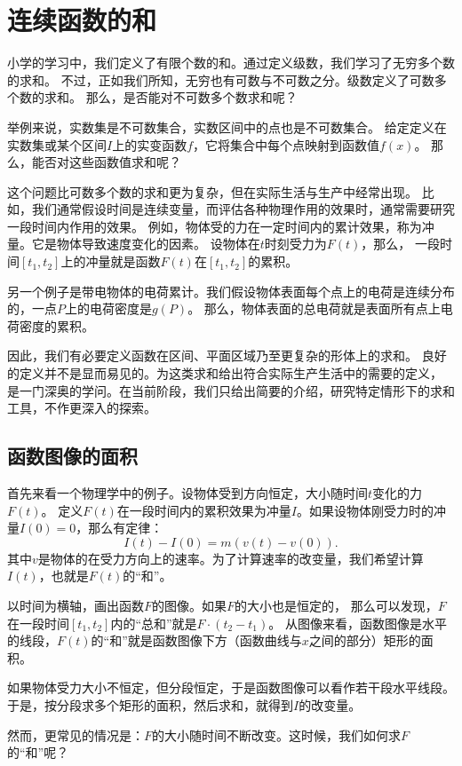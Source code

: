 \documentclass[12pt,UTF8]{ctexbook}
\begin{document}
\chapter{连续函数的和}
小学的学习中，我们定义了有限个数的和。通过定义级数，我们学习了无穷多个数的求和。
不过，正如我们所知，无穷也有可数与不可数之分。级数定义了可数多个数的求和。
那么，是否能对不可数多个数求和呢？

举例来说，实数集是不可数集合，实数区间中的点也是不可数集合。
给定定义在实数集或某个区间$I$上的实变函数$f$，它将集合中每个点映射到函数值$f(x)$。
那么，能否对这些函数值求和呢？

这个问题比可数多个数的求和更为复杂，但在实际生活与生产中经常出现。
比如，我们通常假设时间是连续变量，而评估各种物理作用的效果时，通常需要研究一段时间内作用的效果。
例如，物体受的力在一定时间内的累计效果，称为冲量。它是物体导致速度变化的因素。
设物体在$t$时刻受力为$F(t)$，那么，
一段时间$[t_1, t_2]$上的冲量就是函数$F(t)$在$[t_1, t_2]$的累积。

另一个例子是带电物体的电荷累计。我们假设物体表面每个点上的电荷是连续分布的，一点$P$上的电荷密度是$g(P)$。
那么，物体表面的总电荷就是表面所有点上电荷密度的累积。

因此，我们有必要定义函数在区间、平面区域乃至更复杂的形体上的求和。
良好的定义并不是显而易见的。为这类求和给出符合实际生产生活中的需要的定义，
是一门深奥的学问。在当前阶段，我们只给出简要的介绍，研究特定情形下的求和工具，不作更深入的探索。

\section{函数图像的面积}

首先来看一个物理学中的例子。设物体受到方向恒定，大小随时间$t$变化的力$F(t)$。
定义$F(t)$在一段时间内的累积效果为冲量$I$。如果设物体刚受力时的冲量$I(0) = 0$，那么有定律：
$$ I(t) - I(0) = m(v(t) - v(0)).$$
其中$v$是物体的在受力方向上的速率。为了计算速率的改变量，我们希望计算$I(t)$，也就是$F(t)$的“和”。

以时间为横轴，画出函数$F$的图像。如果$F$的大小也是恒定的，
那么可以发现，$F$在一段时间$[t_1, t_2]$内的“总和”就是$F \cdot (t_2 - t_1)$。
从图像来看，函数图像是水平的线段，$F(t)$的“和”就是函数图像下方（函数曲线与$x$之间的部分）矩形的面积。

如果物体受力大小不恒定，但分段恒定，于是函数图像可以看作若干段水平线段。
于是，按分段求多个矩形的面积，然后求和，就得到$I$的改变量。

然而，更常见的情况是：$F$的大小随时间不断改变。这时候，我们如何求$F$的“和”呢？
\end{document}
